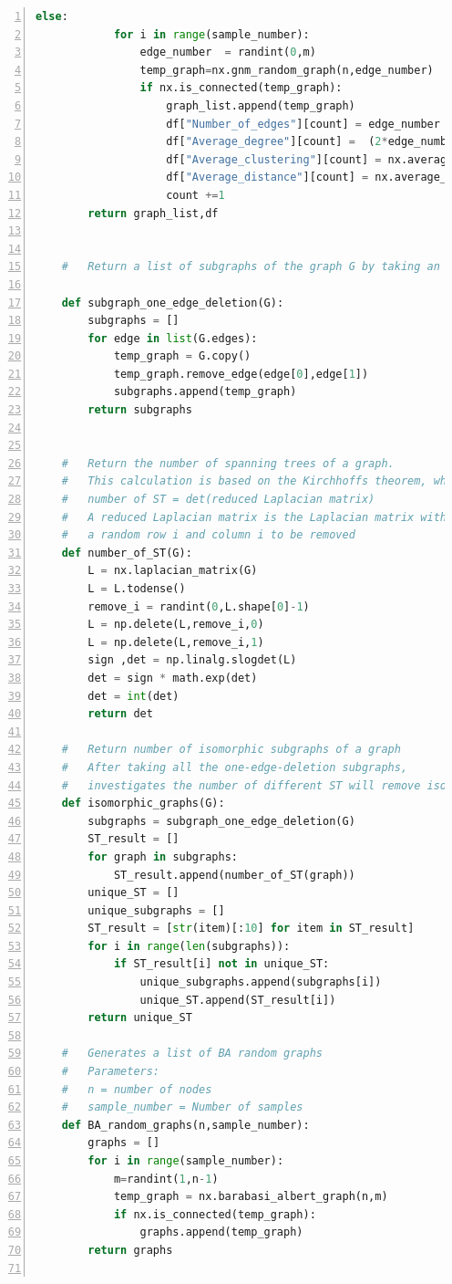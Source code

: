 \documentclass[12pt]{article}
\begin{document}
\begin{lstlisting}[numbers=left,language=Python,breaklines=true]
        else:
            for i in range(sample_number):
                edge_number  = randint(0,m)
                temp_graph=nx.gnm_random_graph(n,edge_number)
                if nx.is_connected(temp_graph):
                    graph_list.append(temp_graph)
                    df["Number_of_edges"][count] = edge_number
                    df["Average_degree"][count] =  (2*edge_number)/n
                    df["Average_clustering"][count] = nx.average_clustering(temp_graph)
                    df["Average_distance"][count] = nx.average_shortest_path_length(temp_graph)
                    count +=1
        return graph_list,df
    
    
    #   Return a list of subgraphs of the graph G by taking an edge off the graph
    
    def subgraph_one_edge_deletion(G):
        subgraphs = []
        for edge in list(G.edges):
            temp_graph = G.copy()
            temp_graph.remove_edge(edge[0],edge[1])
            subgraphs.append(temp_graph)
        return subgraphs
    
    
    #   Return the number of spanning trees of a graph.
    #   This calculation is based on the Kirchhoffs theorem, which is:
    #   number of ST = det(reduced Laplacian matrix)
    #   A reduced Laplacian matrix is the Laplacian matrix with
    #   a random row i and column i to be removed
    def number_of_ST(G):
        L = nx.laplacian_matrix(G)
        L = L.todense()
        remove_i = randint(0,L.shape[0]-1)
        L = np.delete(L,remove_i,0)
        L = np.delete(L,remove_i,1)
        sign ,det = np.linalg.slogdet(L)
        det = sign * math.exp(det)
        det = int(det)
        return det
    
    #   Return number of isomorphic subgraphs of a graph
    #   After taking all the one-edge-deletion subgraphs,
    #   investigates the number of different ST will remove isomorphic subgraphs
    def isomorphic_graphs(G):
        subgraphs = subgraph_one_edge_deletion(G)
        ST_result = []
        for graph in subgraphs:
            ST_result.append(number_of_ST(graph))
        unique_ST = []
        unique_subgraphs = []
        ST_result = [str(item)[:10] for item in ST_result]
        for i in range(len(subgraphs)):
            if ST_result[i] not in unique_ST:
                unique_subgraphs.append(subgraphs[i])
                unique_ST.append(ST_result[i])
        return unique_ST
    
    #   Generates a list of BA random graphs
    #   Parameters:
    #   n = number of nodes
    #   sample_number = Number of samples
    def BA_random_graphs(n,sample_number):
        graphs = []
        for i in range(sample_number):
            m=randint(1,n-1)
            temp_graph = nx.barabasi_albert_graph(n,m)
            if nx.is_connected(temp_graph):
                graphs.append(temp_graph)
        return graphs
    

\end{lstlisting}
\end{document}
